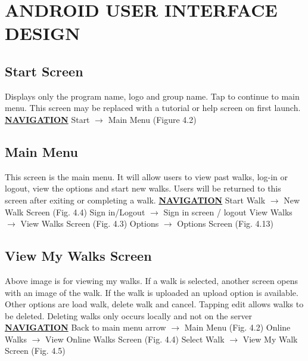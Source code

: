 \documentclass[12pt]{article}
\begin{document}
\section{ANDROID USER INTERFACE DESIGN}
\subsection{Start Screen}
\par{Displays only the program name, logo and group name. Tap to continue to main menu.
This screen may be replaced with a tutorial or help screen on first launch.}\newline
\textbf{\underline{NAVIGATION}} \newline 
Start $\rightarrow$ Main Menu (Figure 4.2)
\subsection{Main Menu}
\par{This screen is the main menu. It will allow users to view past walks, log-in or logout, view the
options and start new walks. Users will be returned to this screen after exiting or completing
a walk.}\newline
\textbf{\underline{NAVIGATION}} \newline 
Start Walk $\rightarrow$ New Walk Screen (Fig. 4.4) \newline
Sign in/Logout $\rightarrow$  Sign in screen / logout \newline
View Walks  $\rightarrow$ View Walks Screen (Fig. 4.3) \newline
Options  $\rightarrow$ Options Screen (Fig. 4.13) \newline
\subsection{View My Walks Screen}
\par{Above image is for viewing my walks. If a walk is selected, another screen opens with an
image of the walk. If the walk is uploaded an upload option is available. Other options are
load walk, delete walk and cancel. Tapping edit allows walks to be deleted. Deleting walks
only occurs locally and not on the server} \newline
\textbf{\underline{NAVIGATION}} \newline 
Back to main menu arrow $\rightarrow$ Main Menu (Fig. 4.2) \newline
Online Walks $\rightarrow$ View Online Walks Screen (Fig. 4.4) \newline
Select Walk $\rightarrow$ View My Walk Screen (Fig. 4.5) \newline
\end{document}
